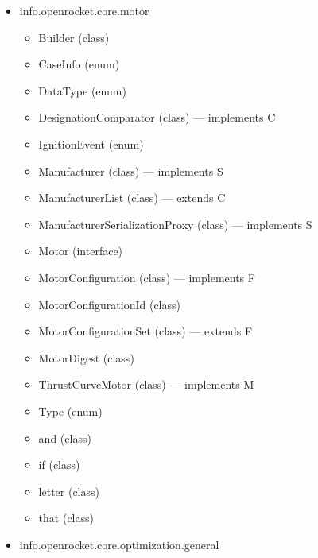 \documentclass{amsdtx}
\begin{document}
\begin{itemize}
\begin{itemize}
\begin{itemize}
    \item
      AltitudeReference (enum)
    \item
      LevelWindModel (class) --- implements C
    \item
      MultiLevelPinkNoiseWindModel (class) --- implements W
    \item
      PinkNoiseWindModel (class) --- implements W
    \item
      WindModel (interface) --- extends M
    \item
      WindModelType (enum)
    \item
      constant (enum)
    \end{itemize}
  \item
    info.openrocket.core.motor

    \begin{itemize}
    
    \item
      Builder (class)
    \item
      CaseInfo (enum)
    \item
      DataType (enum)
    \item
      DesignationComparator (class) --- implements C
    \item
      IgnitionEvent (enum)
    \item
      Manufacturer (class) --- implements S
    \item
      ManufacturerList (class) --- extends C
    \item
      ManufacturerSerializationProxy (class) --- implements S
    \item
      Motor (interface)
    \item
      MotorConfiguration (class) --- implements F
    \item
      MotorConfigurationId (class)
    \item
      MotorConfigurationSet (class) --- extends F
    \item
      MotorDigest (class)
    \item
      ThrustCurveMotor (class) --- implements M
    \item
      Type (enum)
    \item
      and (class)
    \item
      if (class)
    \item
      letter (class)
    \item
      that (class)
    \end{itemize}
  \item
    info.openrocket.core.optimization.general


\end{itemize}
\end{itemize}
\end{document}
